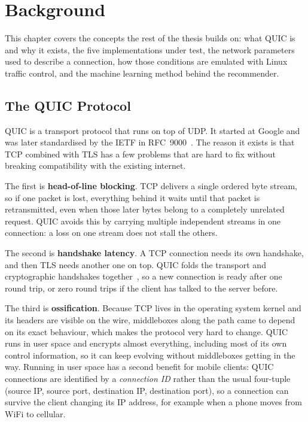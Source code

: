 \chapter{Background}
\label{chapter:background}

This chapter covers the concepts the rest of the thesis builds on: what QUIC
is and why it exists, the five implementations under test, the network
parameters used to describe a connection, how those conditions are emulated
with Linux traffic control, and the machine learning method behind the
recommender.

\section{The QUIC Protocol}
\label{sec:bg-quic}

QUIC is a transport protocol that runs on top of UDP. It started at Google
and was later standardised by the IETF in RFC~9000~\cite{rfc9000}. The reason
it exists is that TCP combined with TLS has a few problems that are hard to
fix without breaking compatibility with the existing internet.

The first is \textbf{head-of-line blocking}. TCP delivers a single ordered byte
stream, so if one packet is lost, everything behind it waits until that packet
is retransmitted, even when those later bytes belong to a completely unrelated
request. QUIC avoids this by carrying multiple independent streams in one
connection: a loss on one stream does not stall the others.

The second is \textbf{handshake latency}. A TCP connection needs its own handshake, and
then TLS needs another one on top. QUIC folds the transport and cryptographic
handshakes together~\cite{rfc9001}, so a new connection is ready after one
round trip, or zero round trips if the client has talked to the server
before.

The third is \textbf{ossification}. Because TCP lives in the operating system kernel
and its headers are visible on the wire, middleboxes along the path came to
depend on its exact behaviour, which makes the protocol very hard to change.
QUIC runs in user space and encrypts almost everything, including most of its
own control information, so it can keep evolving without middleboxes getting
in the way. Running in user space has a second benefit for mobile clients:
QUIC connections are identified by a \emph{connection ID} rather than the usual
four-tuple (source IP, source port, destination IP, destination port), so a connection
can survive the client changing its IP address, for example when a phone moves from
WiFi to cellular.

